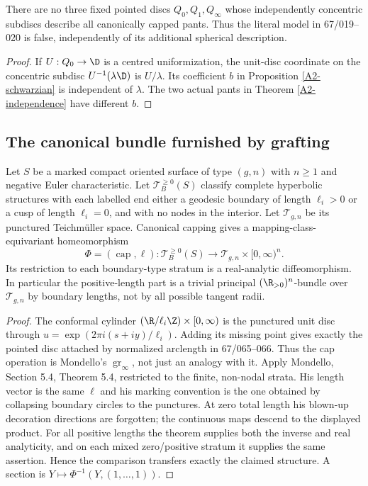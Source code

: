 \begin{corollary}\label{A4-orange-jets}
There are no three fixed pointed discs $Q_0,Q_1,Q_\infty$ whose independently concentric subdiscs describe all canonically capped pants. Thus the literal model in 67/019--020 is false, independently of its additional spherical description.
\end{corollary}
\begin{proof}
If $U:Q_0\to\D$ is a centred uniformization, the unit-disc coordinate on the concentric subdisc $U^{-1}(\lambda\D)$ is $U/\lambda$. Its coefficient $b$ in Proposition \ref{A2-schwarzian} is independent of $\lambda$. The two actual pants in Theorem \ref{A2-independence} have different $b$.
\end{proof}

\subsection{The canonical bundle furnished by grafting}
\begin{theorem}\label{A4-grafting}
Let $S$ be a marked compact oriented surface of type $(g,n)$ with $n\geq1$ and negative Euler characteristic. Let $\mathcal T_B^{\geq0}(S)$ classify complete hyperbolic structures with each labelled end either a geodesic boundary of length $\ell_i>0$ or a cusp of length $\ell_i=0$, and with no nodes in the interior. Let $\mathcal T_{g,n}$ be its punctured Teichm\"uller space. Canonical capping gives a mapping-class-equivariant homeomorphism
\[
\Phi=(\operatorname{cap},\ell):\mathcal T_B^{\geq0}(S)
\longrightarrow\mathcal T_{g,n}\times[0,\infty)^n.
\]
Its restriction to each boundary-type stratum is a real-analytic diffeomorphism. In particular the positive-length part is a trivial principal $(\R_{>0})^n$-bundle over $\mathcal T_{g,n}$ by boundary lengths, not by all possible tangent radii.
\end{theorem}
\begin{proof}
The conformal cylinder $(\R/\ell_i\Z)\times[0,\infty)$ is the punctured unit disc through $u=\exp(2\pi i(s+iy)/\ell_i)$. Adding its missing point gives exactly the pointed disc attached by normalized arclength in 67/065--066. Thus the cap operation is Mondello's $\operatorname{gr}_\infty$, not just an analogy with it. Apply Mondello, Section 5.4, Theorem 5.4, restricted to the finite, non-nodal strata. His length vector is the same $\ell$ and his marking convention is the one obtained by collapsing boundary circles to the punctures. At zero total length his blown-up decoration directions are forgotten; the continuous maps descend to the displayed product. For all positive lengths the theorem supplies both the inverse and real analyticity, and on each mixed zero/positive stratum it supplies the same assertion. Hence the comparison transfers exactly the claimed structure. A section is $Y\mapsto\Phi^{-1}(Y,(1,\ldots,1))$.
\end{proof}

